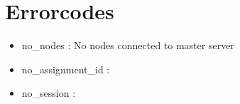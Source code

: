 \section{Errorcodes}
\begin{itemize}[-]
\item no\_nodes : No nodes connected to master server
\item no\_assignment\_id :
\item no\_session :
\end{itemize}